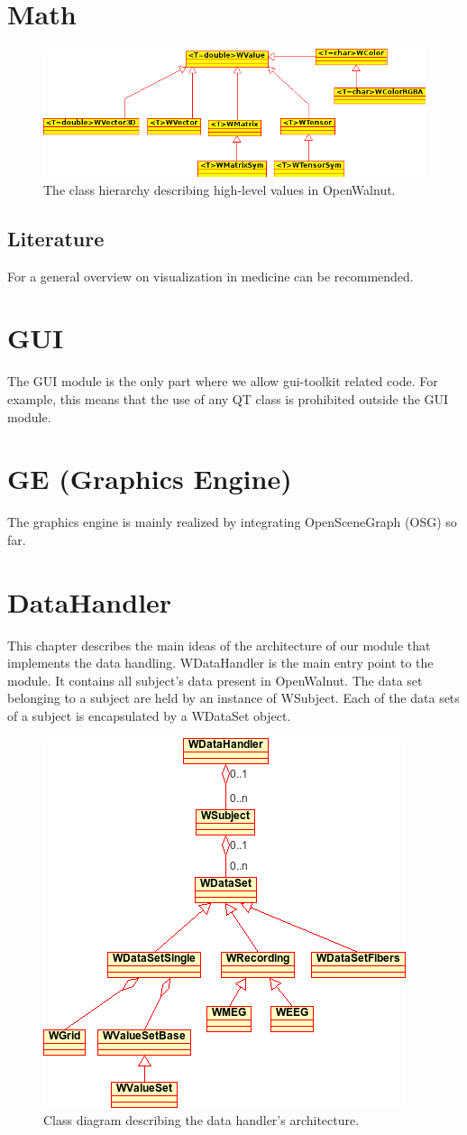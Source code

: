 \documentclass[a4paper,12pt]{scrbook}
\begin{document}
\chapter{Math}


\begin{figure}[htb]
  \includegraphics[width=\textwidth]{WValue_hierachy}
  \caption{The class hierarchy describing high-level values in OpenWalnut.}
\end{figure}
\section{Literature}
For a general overview on visualization in medicine \cite{Preim:2007:VMT} can be recommended.

\chapter{GUI}
The GUI module is the only part where we allow gui-toolkit related code. For example, this means that the use of any QT class is
prohibited outside the GUI module.
\chapter{GE (Graphics Engine)}
The graphics engine is mainly realized by integrating OpenSceneGraph (OSG) so far.
\chapter{DataHandler}
This chapter describes the main ideas of the architecture of our module that implements the data handling. WDataHandler is the
main entry point to the module. It contains all subject's data present in OpenWalnut. The data set belonging to a subject are held by
an instance of WSubject. Each of the data sets of a subject is encapsulated by a WDataSet object. 

\begin{figure}[htb]
  \centering
  \includegraphics[width=.4\textwidth]{dataHandler_classDiagram}
  \caption{Class diagram describing the data handler's architecture.}
\end{figure}
\end{document}
